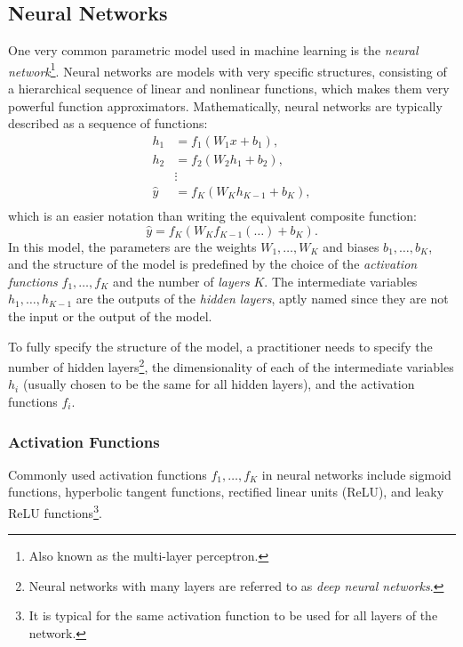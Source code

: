 \subsection{Neural Networks}
One very common parametric model used in machine learning is the \textit{neural network}\footnote{Also known as the multi-layer perceptron.}. Neural networks are models with very specific structures, consisting of a hierarchical sequence of linear and nonlinear functions, which makes them very powerful function approximators. Mathematically, neural networks are typically described as a sequence of functions:
\begin{equation} \label{eq:neuralnet}
\begin{split}
h_1 &= f_1(W_1x + b_1), \\
h_2 &= f_2(W_2h_1 + b_2), \\
& \vdots \\
\hat{y} &= f_K(W_Kh_{K-1} + b_K), \\
\end{split}
\end{equation}
which is an easier notation than writing the equivalent composite function:
\begin{equation*}
\hat{y} =  f_K(W_K f_{K-1}(\dots ) + b_K).
\end{equation*}
In this model, the parameters are the weights $W_1, \dots, W_K$ and biases $b_1, \dots, b_K$, and the structure of the model is predefined by the choice of the \textit{activation functions} $f_1, \dots, f_K$ and the number of \textit{layers} $K$. The intermediate variables $h_1, \dots, h_{K-1}$ are the outputs of the \textit{hidden layers}, aptly named since they are not the input or the output of the model.

To fully specify the structure of the model, a practitioner needs to specify the number of hidden layers\footnote{Neural networks with many layers are referred to as \textit{deep neural networks}.}, the dimensionality of each of the intermediate variables $h_i$ (usually chosen to be the same for all hidden layers), and the activation functions $f_i$.

\subsubsection{Activation Functions}
Commonly used activation functions $f_1, \dots, f_K$ in neural networks include sigmoid functions, hyperbolic tangent functions, rectified linear units (ReLU), and leaky ReLU functions\footnote[][-2\baselineskip]{It is typical for the same activation function to be used for all layers of the network.}.

